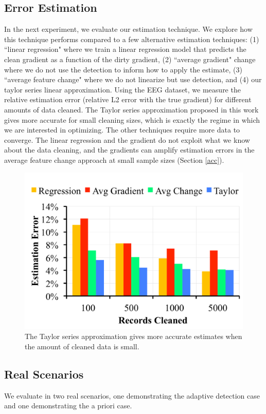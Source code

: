 \subsection{Error Estimation}\label{est}
In the next experiment, we evaluate our estimation technique.
We explore how this technique performs compared to a few alternative estimation techniques: (1) ``linear regression" where we train a linear regression model that predicts the clean gradient as a function of the dirty gradient, (2) ``average gradient" change where we do not use the detection to inform how to apply the estimate, (3) ``average feature change" where we do not linearize but use detection, and (4) our taylor series linear approximation.
Using the EEG dataset, we measure the relative estimation error (relative L2 error with the true gradient) for different amounts of data cleaned.
The Taylor series approximation proposed in this work gives more accurate for small cleaning sizes, which is exactly the regime in which we are interested in optimizing.
The other techniques require more data to converge.
The linear regression and the gradient do not exploit what we know about the data cleaning, and the gradients can amplify estimation errors in the average feature change approach at small sample sizes (Section \ref{acc}).

\begin{figure}[ht!]
\vspace{-2em}
\centering
 \includegraphics[width=0.5\columnwidth]{exp/exp12.pdf}
 \caption{The Taylor series approximation gives more accurate estimates when the amount of cleaned data is small. \label{tradeoffs3}}
\end{figure}


\subsection{Real Scenarios}
We evaluate \sys in two real scenarios, one demonstrating the adaptive detection case and one demonstrating the a priori case.

